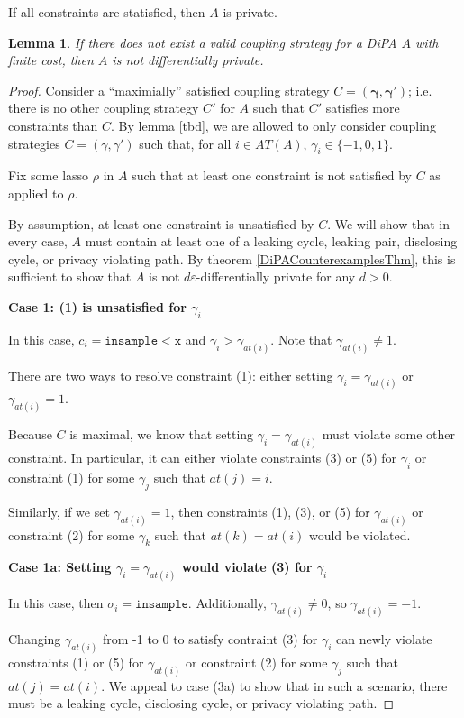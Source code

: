 \documentclass[12pt]{article}
\newcommand{\lguard}[1][x]{\texttt{insample} < #1}
\newtheorem{lemma}[thm]{Lemma}
\theoremstyle{definition}
\begin{document}
If all constraints are statisfied, then $A$ is private. 


\begin{lemma}
    If there does not exist a valid coupling strategy for a DiPA $A$ with finite cost, then $A$ is not differentially private. 
\end{lemma}
\begin{proof}
    Consider a ``maximially'' satisfied coupling strategy $C=(\mathbf{\gamma}, \mathbf{\gamma}')$; i.e. there is no other coupling strategy $C'$ for $A$ such that $C'$ satisfies more constraints than $C$. By lemma [tbd], we are allowed to only consider coupling strategies $C=(\gamma, \gamma')$ such that, for all $i\in AT(A)$, $\gamma_i \in \{-1, 0, 1\}$. 

    Fix some lasso $\rho$ in $A$ such that at least one constraint is not satisfied by $C$ as applied to $\rho$.

    By assumption, at least one constraint is unsatisfied by $C$. We will show that in every case, $A$ must contain at least one of a leaking cycle, leaking pair, disclosing cycle, or privacy violating path. By theorem \ref{DiPACounterexamplesThm}, this is sufficient to show that $A$ is not $d\varepsilon$-differentially private for any $d>0$.

    \textbf{Case 1: (1) is unsatisfied for $\gamma_i$}
    
    In this case, $c_i = \lguard[\texttt{x}]$ and $\gamma_i > \gamma_{at(i)}$. Note that $\gamma_{at(i)} \neq 1$. 

    There are two ways to resolve constraint (1): either setting $\gamma_i = \gamma_{at(i)}$ or $\gamma_{at(i)} = 1$. 

    Because $C$ is maximal, we know that setting $\gamma_i=\gamma_{at(i)}$ must violate some other constraint. In particular, it can either violate constraints (3) or (5) for $\gamma_i$ or constraint (1) for some $\gamma_j$ such that $at(j) = i$. 

    Similarly, if we set $\gamma_{at(i)} = 1$, then constraints (1), (3), or (5) for $\gamma_{at(i)}$ or constraint (2) for some $\gamma_k$ such that $at(k) = at(i)$ would be violated. 



    \textbf{Case 1a: Setting $\gamma_i = \gamma_{at(i)}$ would violate (3) for $\gamma_i$}

    In this case, then $\sigma_i = \texttt{insample}$. Additionally, $\gamma_{at(i)} \neq 0$, so $\gamma_{at(i)} = -1$. 

    Changing $\gamma_{at(i)}$ from -1 to 0 to satisfy contraint (3) for $\gamma_i$ can newly violate constraints (1) or (5) for $\gamma_{at(i)}$ or constraint (2) for some $\gamma_j$ such that $at(j) = at(i)$. We appeal to case (3a) to show that in such a scenario, there must be a leaking cycle, disclosing cycle, or privacy violating path. 


\end{proof}
\end{document}
